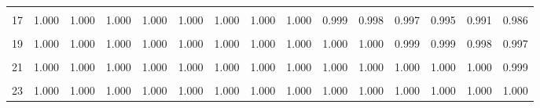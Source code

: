 \documentclass[
]{article}
\begin{document}
\begin{table}[!h]
{\begin{tabular}[t]{ccccccccccccccc}
\cellcolor{gray!10}{16} & \cellcolor{gray!10}{1.000} & \cellcolor{gray!10}{1.000} & \cellcolor{gray!10}{1.000} & \cellcolor{gray!10}{1.000} & \cellcolor{gray!10}{1.000} & \cellcolor{gray!10}{1.000} & \cellcolor{gray!10}{1.000} & \cellcolor{gray!10}{0.999} & \cellcolor{gray!10}{0.998} & \cellcolor{gray!10}{0.996} & \cellcolor{gray!10}{0.993} & \cellcolor{gray!10}{0.989} & \cellcolor{gray!10}{0.982} & \cellcolor{gray!10}{0.973}\\
17 & 1.000 & 1.000 & 1.000 & 1.000 & 1.000 & 1.000 & 1.000 & 1.000 & 0.999 & 0.998 & 0.997 & 0.995 & 0.991 & 0.986\\
\cellcolor{gray!10}{18} & \cellcolor{gray!10}{1.000} & \cellcolor{gray!10}{1.000} & \cellcolor{gray!10}{1.000} & \cellcolor{gray!10}{1.000} & \cellcolor{gray!10}{1.000} & \cellcolor{gray!10}{1.000} & \cellcolor{gray!10}{1.000} & \cellcolor{gray!10}{1.000} & \cellcolor{gray!10}{1.000} & \cellcolor{gray!10}{0.999} & \cellcolor{gray!10}{0.999} & \cellcolor{gray!10}{0.998} & \cellcolor{gray!10}{0.996} & \cellcolor{gray!10}{0.993}\\
19 & 1.000 & 1.000 & 1.000 & 1.000 & 1.000 & 1.000 & 1.000 & 1.000 & 1.000 & 1.000 & 0.999 & 0.999 & 0.998 & 0.997\\
\addlinespace
\cellcolor{gray!10}{20} & \cellcolor{gray!10}{1.000} & \cellcolor{gray!10}{1.000} & \cellcolor{gray!10}{1.000} & \cellcolor{gray!10}{1.000} & \cellcolor{gray!10}{1.000} & \cellcolor{gray!10}{1.000} & \cellcolor{gray!10}{1.000} & \cellcolor{gray!10}{1.000} & \cellcolor{gray!10}{1.000} & \cellcolor{gray!10}{1.000} & \cellcolor{gray!10}{1.000} & \cellcolor{gray!10}{1.000} & \cellcolor{gray!10}{0.999} & \cellcolor{gray!10}{0.998}\\
21 & 1.000 & 1.000 & 1.000 & 1.000 & 1.000 & 1.000 & 1.000 & 1.000 & 1.000 & 1.000 & 1.000 & 1.000 & 1.000 & 0.999\\
\cellcolor{gray!10}{22} & \cellcolor{gray!10}{1.000} & \cellcolor{gray!10}{1.000} & \cellcolor{gray!10}{1.000} & \cellcolor{gray!10}{1.000} & \cellcolor{gray!10}{1.000} & \cellcolor{gray!10}{1.000} & \cellcolor{gray!10}{1.000} & \cellcolor{gray!10}{1.000} & \cellcolor{gray!10}{1.000} & \cellcolor{gray!10}{1.000} & \cellcolor{gray!10}{1.000} & \cellcolor{gray!10}{1.000} & \cellcolor{gray!10}{1.000} & \cellcolor{gray!10}{1.000}\\
23 & 1.000 & 1.000 & 1.000 & 1.000 & 1.000 & 1.000 & 1.000 & 1.000 & 1.000 & 1.000 & 1.000 & 1.000 & 1.000 & 1.000\\
\bottomrule
\end{tabular}}
\end{table}
\newpage
\end{document}
